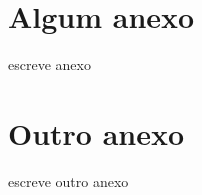 \begin{anexosenv}
    
    \partanexos
    
    \chapter{Algum anexo}

    escreve anexo
    
    \chapter{Outro anexo}
    
    escreve outro anexo
    
\end{anexosenv}
